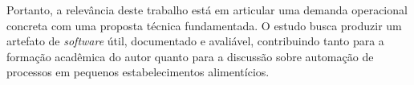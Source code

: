 Portanto, a relevância deste trabalho está em articular uma demanda operacional concreta com uma proposta técnica fundamentada. O estudo busca produzir um artefato de \textit{software} útil, documentado e avaliável, contribuindo tanto para a formação acadêmica do autor quanto para a discussão sobre automação de processos em pequenos estabelecimentos alimentícios.
